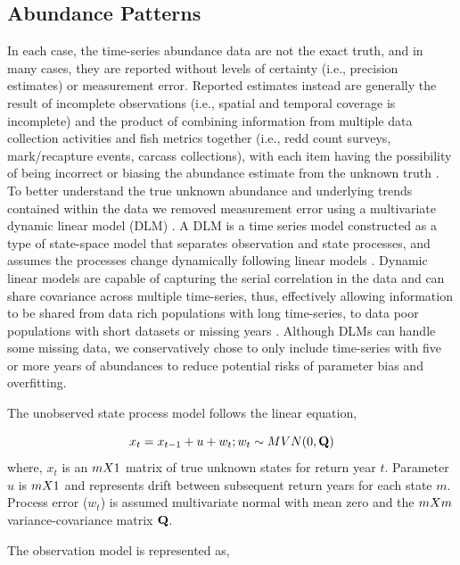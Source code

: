 \documentclass[12pt,a4paper]{article}
\begin{document}
\subsection{Abundance Patterns}\label{abundance-patterns}

In each case, the time-series abundance data are not the exact truth, and in many cases, they are reported without levels of certainty (i.e., precision estimates) or measurement error. Reported estimates instead are generally the result of incomplete observations (i.e., spatial and temporal coverage is incomplete) and the product of combining information from multiple data collection activities and fish metrics together (i.e., redd count surveys, mark/recapture events, carcass collections), with each item having the possibility of being incorrect or biasing the abundance estimate from the unknown truth \autocite{auger-methe_guide_2021}. To better understand the true unknown abundance and underlying trends contained within the data we removed measurement error using a multivariate dynamic linear model (DLM) \autocite{zuur_estimating_2003}. A DLM is a time series model constructed as a type of state-space model that separates observation and state processes, and assumes the processes change dynamically following linear models \autocite{royle_hierarchical_2008}. Dynamic linear models are capable of capturing the serial correlation in the data and can share covariance across multiple time-series, thus, effectively allowing information to be shared from data rich populations with long time-series, to data poor populations with short datasets or missing years \autocite{auger-methe_guide_2021,holmes_marss_2012}. Although DLMs can handle some missing data, we conservatively chose to only include time-series with five or more years of abundances to reduce potential risks of parameter bias and overfitting.

The unobserved state process model follows the linear equation,

\[
x_t = x_{t-1} + u + w_t; \\
w_t \sim MVN(0,\mathbf{Q})
\]
where, \(x_t\) is an \(m \space X \space 1\) matrix of true unknown states for return year \(t\). Parameter \(u\) is \(m \space X \space 1\) and represents drift between subsequent return years for each state \(m\). Process error (\(w_t\)) is assumed multivariate normal with mean zero and the \(m \space X \space m\) variance-covariance matrix \(\bf{Q}\).

The observation model is represented as,
\end{document}
